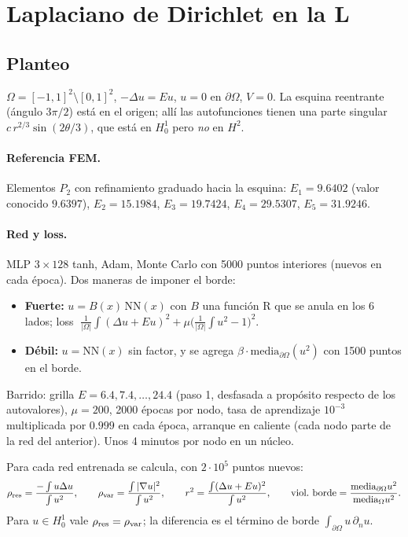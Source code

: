 \documentclass[11pt,a4paper]{article}
\begin{document}
\section{Laplaciano de Dirichlet en la L}

\subsection{Planteo}
$\Omega=[-1,1]^2\setminus[0,1]^2$, $-\Delta u=Eu$, $u=0$ en $\partial\Omega$, $V=0$. La esquina reentrante (ángulo $3\pi/2$)
está en el origen; allí las autofunciones tienen una parte singular $c\,r^{2/3}\sin(2\theta/3)$, que está en $H^1_0$ pero
\emph{no} en $H^2$.

\paragraph{Referencia FEM.} Elementos $P_2$ con refinamiento graduado hacia la esquina:
$E_1=9.6402$ (valor conocido $9.6397$), $E_2=15.1984$, $E_3=19.7424$, $E_4=29.5307$, $E_5=31.9246$.

\paragraph{Red y loss.} MLP $3\times128$ tanh, Adam, Monte Carlo con 5000 puntos interiores (nuevos en cada época).
Dos maneras de imponer el borde:
\begin{itemize}
\item \textbf{Fuerte:} $u=B(x)\,\mathrm{NN}(x)$ con $B$ una función R que se anula en los 6 lados; loss
$\;\frac1{|\Omega|}\!\int(\Delta u+Eu)^2+\mu\big(\frac1{|\Omega|}\!\int u^2-1\big)^2$.
\item \textbf{Débil:} $u=\mathrm{NN}(x)$ sin factor, y se agrega $\beta\cdot\mathrm{media}_{\partial\Omega}(u^2)$ con 1500 puntos
en el borde.
\end{itemize}
Barrido: grilla $E=6.4,7.4,\dots,24.4$ (paso 1, desfasada a propósito respecto de los autovalores), $\mu=200$,
2000 épocas por nodo, tasa de aprendizaje $10^{-3}$ multiplicada por $0.999$ en cada época, arranque en caliente
(cada nodo parte de la red del anterior). Unos 4 minutos por nodo en un núcleo.

Para cada red entrenada se calcula, con $2\cdot10^5$ puntos nuevos:
\[
\rho_{\rm res}=\frac{-\int u\Delta u}{\int u^2},\qquad
\rho_{\rm var}=\frac{\int|\nabla u|^2}{\int u^2},\qquad
r^2=\frac{\int(\Delta u+Eu)^2}{\int u^2},\qquad
\text{viol.\ borde}=\frac{\mathrm{media}_{\partial\Omega}u^2}{\mathrm{media}_\Omega u^2}.
\]
Para $u\in H^1_0$ vale $\rho_{\rm res}=\rho_{\rm var}$; la diferencia es el término de borde $\int_{\partial\Omega}u\,\partial_nu$.
\end{document}
